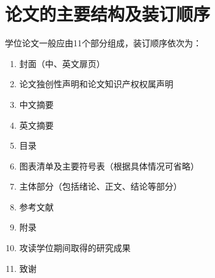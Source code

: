 
\chapter{论文的主要结构及装订顺序}
学位论文一般应由11个部分组成，装订顺序依次为：

\begin{enumerate}
\item 封面（中、英文扉页）
\item 论文独创性声明和论文知识产权权属声明
\item 中文摘要
\item 英文摘要
\item 目录
\item 图表清单及主要符号表（根据具体情况可省略）
\item 主体部分（包括绪论、正文、结论等部分）
\item 参考文献
\item 附录
\item 攻读学位期间取得的研究成果
\item 致谢
\end{enumerate}

